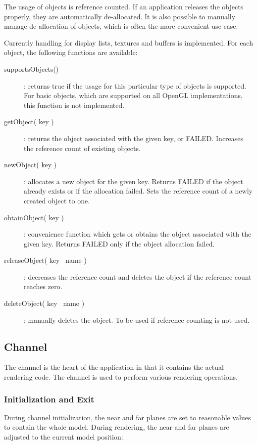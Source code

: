 \documentclass[10pt,a4]{scrartcl}
\begin{document}
The usage of objects is reference counted. If an application releases
the objects properly, they are automatically de-allocated. It is also
possible to manually manage de-allocation of objects, which is often the
more convenient use case.

Currently handling for display lists, textures and buffers is
implemented. For each object, the following functions are available:

\begin{description}
\item[supportsObjects()]: returns true if the usage for this particular
  type of objects is supported. For basic objects, which are supported
  on all OpenGL implementations, this function is not implemented.
\item[getObject( key )]: returns the object associated with the given
  key, or FAILED. Increases the reference count of existing objects.
\item[newObject( key )]: allocates a new object for the given
  key. Returns FAILED if the object already exists or if the allocation
  failed. Sets the reference count of a newly created object to one.
\item[obtainObject( key )]: convenience function which gets or obtains
  the object associated with the given key. Returns FAILED only if the
  object allocation failed.
\item[releaseObject( key \textbar\ name )]: decreases the reference count and
  deletes the object if the reference count reaches zero.
\item[deleteObject( key \textbar\ name )]: manually deletes the object. To be
  used if reference counting is not used.
\end{description}


\subsection{Channel}

The channel is the heart of the application in that it contains the
actual rendering code. The channel is used to perform various rendering
operations.

\subsubsection{Initialization and Exit}

During channel initialization, the near and far planes are set to
reasonable values to contain the whole model. During rendering, the near
and far planes are adjusted to the current model position:
\end{document}
